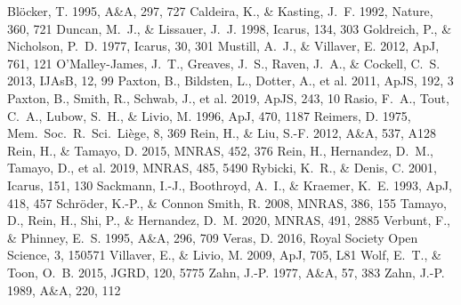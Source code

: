\documentclass[twocolumn]{aastex631}
\begin{document}
\begin{thebibliography}{}

 Bl\"ocker, T. 1995, A\&A, 297, 727
 Caldeira, K., \& Kasting,
J.~F. 1992, Nature, 360, 721
 Duncan, M.~J., \&
Lissauer, J.~J. 1998, Icarus, 134, 303
 Goldreich, P.,
\& Nicholson, P.~D. 1977, Icarus, 30, 301
 Mustill, A.~J., \& Villaver,
E. 2012, ApJ, 761, 121
 O'Malley-James, J.~T.,
Greaves, J.~S., Raven, J.~A., \& Cockell, C.~S. 2013, IJAsB, 12, 99
 Paxton, B., Bildsten, L., Dotter, A.,
et al. 2011, ApJS, 192, 3
 Paxton, B., Smith, R., Schwab, J.,
et al. 2019, ApJS, 243, 10
 Rasio, F.~A., Tout, C.~A., Lubow, S.~H.,
\& Livio, M. 1996, ApJ, 470, 1187
 Reimers, D. 1975, Mem.\ Soc.\ R.\ Sci.\
Li\`ege, 8, 369
 Rein, H., \& Liu, S.-F. 2012, A\&A,
537, A128
 Rein, H., \& Tamayo, D. 2015,
MNRAS, 452, 376
 Rein, H., Hernandez, D.~M.,
Tamayo, D., et al. 2019, MNRAS, 485, 5490
 Rybicki, K.~R., \& Denis, C. 2001,
Icarus, 151, 130
 Sackmann, I.-J., Boothroyd, A.~I., \&
Kraemer, K.~E. 1993, ApJ, 418, 457
 Schr\"oder, K.-P., \&
Connon Smith, R. 2008, MNRAS, 386, 155
 Tamayo, D., Rein, H., Shi, P., \&
Hernandez, D.~M. 2020, MNRAS, 491, 2885
 Verbunt, F., \& Phinney,
E.~S. 1995, A\&A, 296, 709
 Veras, D. 2016, Royal Society Open Science, 3,
150571
 Villaver, E., \& Livio, M. 2009,
ApJ, 705, L81
 Wolf, E.~T., \& Toon, O.~B. 2015, JGRD,
120, 5775
 Zahn, J.-P. 1977, A\&A, 57, 383
 Zahn, J.-P. 1989, A\&A, 220, 112

\end{thebibliography}
\end{document}
